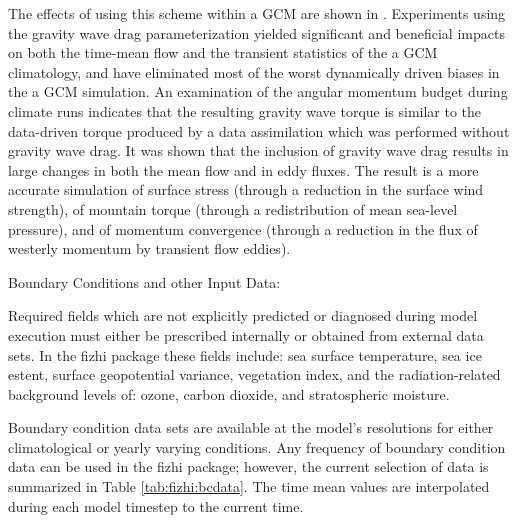 The effects of using this scheme within a GCM are shown in \cite{taksz:96}.
Experiments using the gravity wave drag parameterization yielded significant and
beneficial impacts on both the time-mean flow and the transient statistics of the
a GCM climatology, and have eliminated most of the worst dynamically driven biases 
in the a GCM simulation. 
An examination of the angular momentum budget during climate runs indicates that the 
resulting gravity wave torque is similar to the data-driven torque produced by a data 
assimilation which was performed without gravity
wave drag.  It was shown that the inclusion of gravity wave drag results in 
large changes in both the mean flow and in eddy fluxes.
The result is a more
accurate simulation of surface stress (through a reduction in the surface wind strength), 
of mountain torque (through a redistribution of mean sea-level pressure), and of momentum
convergence (through a reduction in the flux of westerly momentum by transient flow eddies).  


Boundary Conditions and other Input Data:

Required fields which are not explicitly predicted or diagnosed during model execution must
either be prescribed internally or obtained from external data sets.  In the fizhi package these
fields include:  sea surface temperature, sea ice estent, surface geopotential variance, 
vegetation index, and the radiation-related background levels of: ozone, carbon dioxide, 
and stratospheric moisture.

Boundary condition data sets are available at the model's 
resolutions for either climatological or yearly varying conditions. 
Any frequency of boundary condition data can be used in the fizhi package; 
however, the current selection of data is summarized in Table \ref{tab:fizhi:bcdata}\@.
The time mean values are interpolated during each model timestep to the 
current time. 

